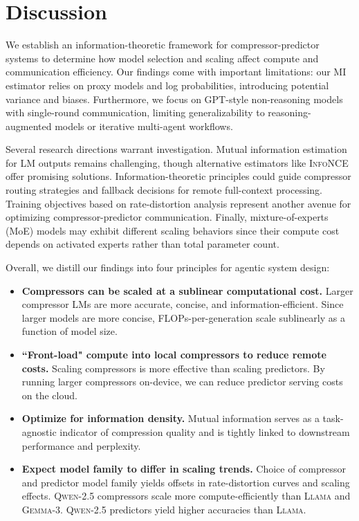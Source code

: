 \documentclass{article} %
\begin{document}
\section{Discussion}
\label{sec:discussion}
We establish an information-theoretic framework for compressor-predictor systems to determine how model selection and scaling affect compute and communication efficiency. Our findings come with important limitations: our MI estimator relies on proxy models and log probabilities, introducing potential variance and biases. Furthermore, we focus on \textsc{GPT}-style non-reasoning models with single-round communication, limiting generalizability to reasoning-augmented models or iterative multi-agent workflows.

Several research directions warrant investigation. Mutual information estimation for LM outputs remains challenging, though alternative estimators like \textsc{InfoNCE} \citep{aitchison2021infonce} offer promising solutions. Information-theoretic principles could guide compressor routing strategies and fallback decisions for remote full-context processing. Training objectives based on rate-distortion analysis represent another avenue for optimizing compressor-predictor communication. Finally, mixture-of-experts (MoE) models \citep{fedus2022switch} may exhibit different scaling behaviors since their compute cost depends on activated experts rather than total parameter count.

Overall, we distill our findings into four principles for agentic system design:

\begin{exampleboxprinciples}
\small
\begin{itemize}[leftmargin=*]
    \item \textbf{Compressors can be scaled at a sublinear computational cost.} Larger compressor LMs are more accurate, concise, and information-efficient. Since larger models are more concise, FLOPs-per-generation scale sublinearly as a function of model size.
    \item \textbf{``Front-load" compute into local compressors to reduce remote costs.} Scaling compressors is more effective than scaling predictors. By running larger compressors on-device, we can reduce predictor serving costs on the cloud.
    \item \textbf{Optimize for information density.} Mutual information serves as a task-agnostic indicator of compression quality and is tightly linked to downstream performance and perplexity. 
    \item \textbf{Expect model family to differ in scaling trends.} Choice of compressor and predictor model family yields offsets in rate-distortion curves and scaling effects. \textsc{Qwen-2.5} compressors scale more compute-efficiently than \textsc{Llama} and \textsc{Gemma-3}. \textsc{Qwen-2.5} predictors yield higher accuracies than \textsc{Llama}.
\end{itemize}
\end{exampleboxprinciples}
\end{document}
